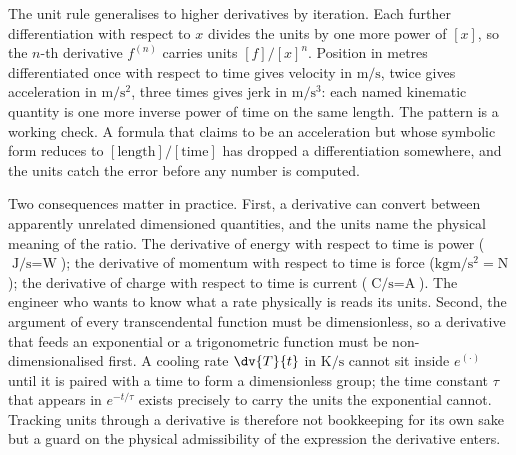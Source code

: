 The unit rule generalises to higher derivatives by iteration. Each
further differentiation with respect to $x$ divides the units by one
more power of $[x]$, so the $n$-th derivative $f^{(n)}$ carries units
$[f]/[x]^{n}$. Position in metres differentiated once with respect to
time gives velocity in $\si{\meter\per\second}$, twice gives
acceleration in $\si{\meter\per\second\squared}$, three times gives
jerk in $\si{\meter\per\second\cubed}$: each named kinematic quantity
is one more inverse power of time on the same length. The pattern is a
working check. A formula that claims to be an acceleration but whose
symbolic form reduces to $[\text{length}]/[\text{time}]$ has dropped a
differentiation somewhere, and the units catch the error before any
number is computed.

Two consequences matter in practice. First, a derivative can convert
between apparently unrelated dimensioned quantities, and the units
name the physical meaning of the ratio. The derivative of energy with
respect to time is power ($\si{\joule\per\second} = \si{\watt}$); the
derivative of momentum with respect to time is force
($\si{\kilogram\meter\per\second\squared} = \si{\newton}$); the
derivative of charge with respect to time is current
($\si{\coulomb\per\second} = \si{\ampere}$). The engineer who wants to
know what a rate physically is reads its units. Second, the argument of
every transcendental function must be dimensionless, so a derivative
that feeds an exponential or a trigonometric function must be
non-dimensionalised first. A cooling rate $\dv{T}{t}$ in
$\si{\kelvin\per\second}$ cannot sit inside $e^{(\cdot)}$ until it is
paired with a time to form a dimensionless group; the time constant
$\tau$ that appears in $e^{-t/\tau}$ exists precisely to carry the
units the exponential cannot. Tracking units through a derivative is
therefore not bookkeeping for its own sake but a guard on the physical
admissibility of the expression the derivative enters.

